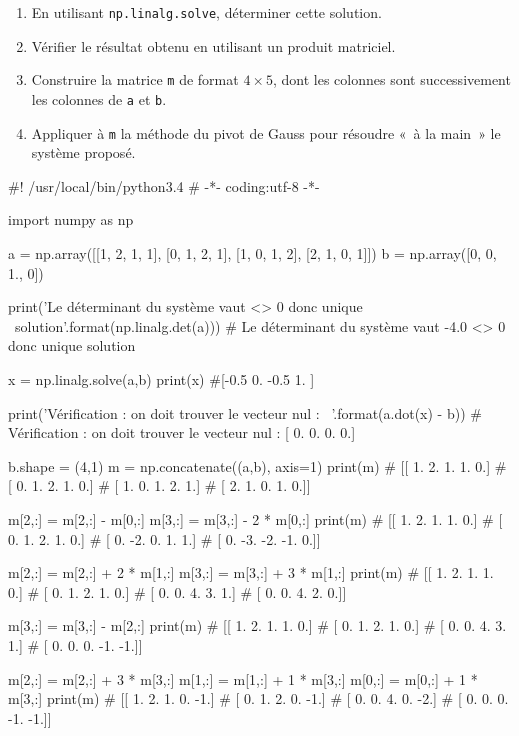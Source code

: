 \documentclass[10pt,fleqn]{article} %
\begin{document}
\begin{multicols}{2}
\begin{enumerate}
\item 
  En utilisant \texttt{np.linalg.solve}, déterminer cette solution.

\item 
  Vérifier le résultat obtenu en utilisant un produit matriciel.

\item 
  Construire la matrice \texttt{m} de format $4\times 5$, dont les
  colonnes sont successivement les colonnes de \texttt{a} et
  \texttt{b}.

\item 
  Appliquer à \texttt{m} la méthode du pivot de Gauss pour résoudre
  «~à la main~» le
  système proposé.
  
\end{enumerate}
\ifprof 
\begin{corrige}
\begin{python}
#! /usr/local/bin/python3.4
# -*- coding:utf-8 -*-
    
import numpy as np

a = np.array([[1, 2, 1, 1],
              [0, 1, 2, 1],
              [1, 0, 1, 2],
              [2, 1, 0, 1]])
b = np.array([0, 0, 1., 0])

print('Le déterminant du système vaut {} <> 0 donc unique \
solution'.format(np.linalg.det(a)))
# Le déterminant du système vaut -4.0 <> 0 donc unique solution

x = np.linalg.solve(a,b)
print(x)
#[-0.5  0.  -0.5  1. ]

print('Vérification : on doit trouver le vecteur nul : \
{}'.format(a.dot(x) - b))
# Vérification : on doit trouver le vecteur nul : [ 0.  0.  0.  0.]

b.shape = (4,1)
m = np.concatenate((a,b), axis=1)
print(m)
# [[ 1.  2.  1.  1.  0.]
#  [ 0.  1.  2.  1.  0.]
#  [ 1.  0.  1.  2.  1.]
#  [ 2.  1.  0.  1.  0.]]

m[2,:] = m[2,:] - m[0,:]
m[3,:] = m[3,:] - 2 * m[0,:]
print(m)
# [[ 1.  2.  1.  1.  0.]
#  [ 0.  1.  2.  1.  0.]
#  [ 0. -2.  0.  1.  1.]
#  [ 0. -3. -2. -1.  0.]]

m[2,:] = m[2,:] + 2 * m[1,:]
m[3,:] = m[3,:] + 3 * m[1,:]
print(m)
# [[ 1.  2.  1.  1.  0.]
#  [ 0.  1.  2.  1.  0.]
#  [ 0.  0.  4.  3.  1.]
#  [ 0.  0.  4.  2.  0.]]

m[3,:] = m[3,:] - m[2,:]
print(m)
# [[ 1.  2.  1.  1.  0.]
#  [ 0.  1.  2.  1.  0.]
#  [ 0.  0.  4.  3.  1.]
#  [ 0.  0.  0. -1. -1.]]

m[2,:] = m[2,:] + 3 * m[3,:]
m[1,:] = m[1,:] + 1 * m[3,:]
m[0,:] = m[0,:] + 1 * m[3,:]
print(m)
# [[ 1.  2.  1.  0. -1.]
#  [ 0.  1.  2.  0. -1.]
#  [ 0.  0.  4.  0. -2.]
#  [ 0.  0.  0. -1. -1.]]


\end{python}
\end{corrige}
\end{multicols}
\end{document}
